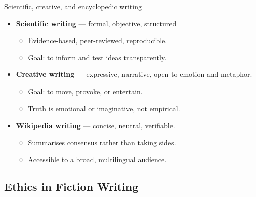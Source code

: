 \documentclass[aspectratio=169]{beamer}
\begin{document}
\begin{frame}{Scientific, creative, and encyclopedic writing}
\begin{itemize}
  \item \textbf{Scientific writing} — formal, objective, structured
    \begin{itemize}
      \item Evidence-based, peer-reviewed, reproducible.  
      \item Goal: to inform and test ideas transparently.
    \end{itemize}
  \item \textbf{Creative writing} — expressive, narrative, open to emotion and metaphor.  
    \begin{itemize}
      \item Goal: to move, provoke, or entertain.  
      \item Truth is emotional or imaginative, not empirical.
    \end{itemize}
  \item \textbf{Wikipedia writing} — concise, neutral, verifiable.  
    \begin{itemize}
      \item Summarises consensus rather than taking sides.  
      \item Accessible to a broad, multilingual audience.
    \end{itemize}
\end{itemize}

\end{frame}

\subsection{Ethics in Fiction Writing}
\end{document}
